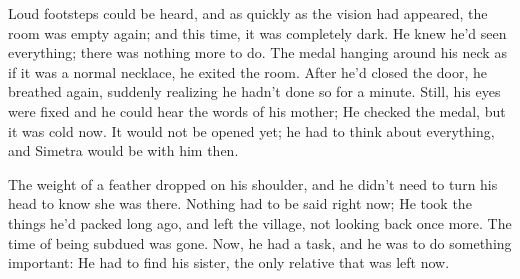 Loud footsteps could be heard, and as quickly as the vision had appeared, the room was empty again; and this time, it was completely dark. He knew he'd seen everything; there was nothing more to do. The medal hanging around his neck as if it was a normal necklace, he exited the room. After he'd closed the door, he breathed again, suddenly realizing he hadn't done so for a minute. Still, his eyes were fixed and he could hear the words of his mother; He checked the medal, but it was cold now. It would not be opened yet; he had to think about everything, and Simetra would be with him then.

The weight of a feather dropped on his shoulder, and he didn't need to turn his head to know she was there. 
Nothing had to be said right now; He took the things he'd packed long ago, and left the village, not looking back once more. 
The time of being subdued was gone. Now, he had a task, and he was to do something important: He had to find his sister, the only relative that was left now. 
